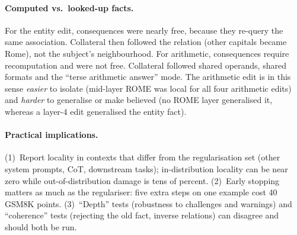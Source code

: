 \paragraph{Computed vs.\ looked-up facts.}
For the entity edit, consequences were nearly free, because they re-query the same association. Collateral then followed the relation (other capitals became Rome), not the subject's neighbourhood. For arithmetic, consequences require recomputation and were not free. Collateral followed shared operands, shared formats and the ``terse arithmetic answer'' mode. The arithmetic edit is in this sense \emph{easier} to isolate (mid-layer ROME was local for all four arithmetic edits) and \emph{harder} to generalise or make believed (no ROME layer generalised it, whereas a layer-4 edit generalised the entity fact).

\paragraph{Practical implications.}
(1)~Report locality in contexts that differ from the regularisation set (other system prompts, CoT, downstream tasks); in-distribution locality can be near zero while out-of-distribution damage is tens of percent. (2)~Early stopping matters as much as the regulariser: five extra steps on one example cost 40 GSM8K points. (3)~``Depth'' tests (robustness to challenges and warnings) and ``coherence'' tests (rejecting the old fact, inverse relations) can disagree and should both be run.

